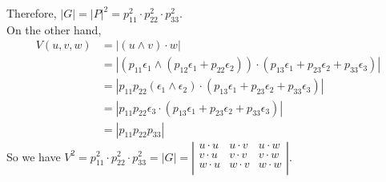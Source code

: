 \documentclass{article}
\begin{document}
Therefore, $|G| = |P|^2 = p_{11}^2 \cdot p_{22}^2 \cdot p_{33}^2$.\\
On the other hand,
$$
\begin{aligned}
    V(u,v,w) &= |(u \wedge v) \cdot w|\\
    &= |(p_{11}\epsilon_1 \wedge (p_{12}\epsilon_1 + p_{22}\epsilon_2)) \cdot (p_{13}\epsilon_1 + p_{23}\epsilon_2 + p_{33}\epsilon_3)|\\
    &= |p_{11}p_{22}(\epsilon_1 \wedge \epsilon_2) \cdot (p_{13}\epsilon_1 + p_{23}\epsilon_2 + p_{33}\epsilon_3)|\\
    &= |p_{11}p_{22}\epsilon_3 \cdot (p_{13}\epsilon_1 + p_{23}\epsilon_2 + p_{33}\epsilon_3)|\\
    &= |p_{11}p_{22}p_{33}|
\end{aligned}
$$
So we have $V^2 = p_{11}^2 \cdot p_{22}^2 \cdot p_{33}^2 = |G| = 
\left|\begin{array}{ccc} 
    u \cdot u & u \cdot v & u \cdot w \\ 
    v \cdot u & v \cdot v & v \cdot w \\ 
    w \cdot u & w \cdot v & w \cdot w \\ 
\end{array}\right|$.\quad \qedsymbol
\end{document}
